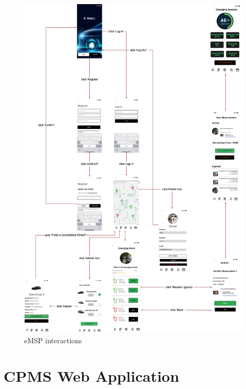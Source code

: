 \documentclass{Configuration_Files/PoliMi3i_thesis}
\begin{document}
\begin{figure}[H]
    \centering
    \includegraphics[width=1\textwidth]{Images/user-interface/emsp/eMSP-interactions.jpg}
    \caption{eMSP interactions}
\end{figure}

\section{CPMS Web Application}
\end{document}
